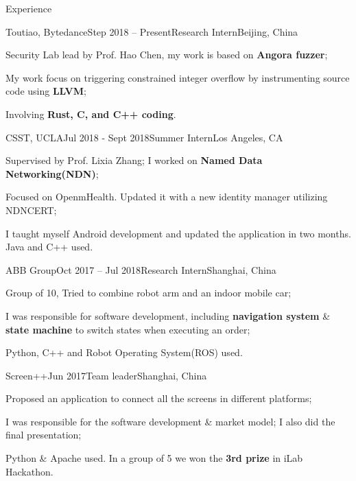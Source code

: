 \documentclass{resume} %
\begin{document}
\begin{rSection}{Experience}

\begin{rSubsection}
  {Toutiao, Bytedance}{Step 2018 – Present}{Research Intern}{Beijing, China}
    \item Security Lab lead by Prof. Hao Chen, my work is based on \textbf{Angora fuzzer};
    \item My work focus on triggering constrained integer overflow by instrumenting source code using \textbf{LLVM};
    \item Involving \textbf{Rust, C, and C++ coding}.
\end{rSubsection}


\begin{rSubsection}
  {CSST, UCLA}{Jul 2018 - Sept 2018}{Summer Intern}{Los Angeles, CA}
    \item Supervised by Prof. Lixia Zhang; I worked on \textbf{Named Data Networking(NDN)};
    \item Focused on OpenmHealth. Updated it with a new identity manager utilizing NDNCERT;
    \item I taught myself Android development and updated the application in two months. Java and C++ used.
\end{rSubsection}


\begin{rSubsection}
  {ABB Group}{Oct 2017 – Jul 2018}{Research Intern}{Shanghai, China}
    \item Group of 10, Tried to combine robot arm and an indoor mobile car;
    \item I was responsible for software development, including \textbf{navigation system} \& \textbf{state machine} to switch states when executing an order;
    \item Python, C++ and Robot Operating System(ROS) used.
\end{rSubsection}


\begin{rSubsection}
  {Screen++}{Jun 2017}{Team leader}{Shanghai, China}
    \item Proposed an application to connect all the screens in different platforms;
    \item I was responsible for the software development \& market model; I also did the final presentation;
    \item Python \& Apache used. In a group of 5 we won the \textbf{3rd prize} in iLab Hackathon.
\end{rSubsection}

\end{rSection}
\end{document}

